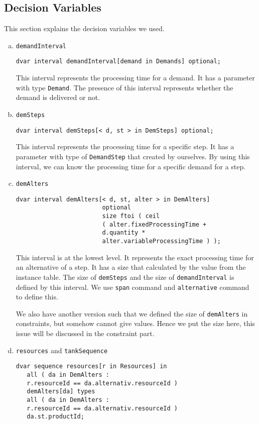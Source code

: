 \documentclass[a4paper, 12pt]{article}
\newcommand{\twoline}{\vspace{2ex}}
\begin{document}
\subsection{Decision Variables}
\twoline 

This section explains the decision variables we used. 
\begin{enumerate}[a.~]
\item \texttt{demandInterval}
\begin{lstlisting}
dvar interval demandInterval[demand in Demands] optional;
\end{lstlisting}
This interval represents the processing time for a demand. It has a parameter with type \texttt{Demand}. The presence of this interval represents whether the demand is delivered or not. 
\item \texttt{demSteps}
\begin{lstlisting}
dvar interval demSteps[< d, st > in DemSteps] optional;
\end{lstlisting}
This interval represents the processing time for a specific step. It has a parameter with type of \texttt{DemandStep} that created by ourselves. By using this interval, we can know the processing time for a specific demand for a step. 
\item \texttt{demAlters}
\begin{lstlisting}
dvar interval demAlters[< d, st, alter > in DemAlters] 
                        optional 
                        size ftoi ( ceil 
                        ( alter.fixedProcessingTime + 
                        d.quantity * 
                        alter.variableProcessingTime ) );
\end{lstlisting}
This interval is at the lowest level. It represents the exact processing time for an alternative of a step. It has a size that calculated by the value from the instance table. The size of \texttt{demSteps} and the size of \texttt{demandInterval} is defined by this interval. We use \texttt{span} command and \texttt{alternative} command to define this. 

We also have another version such that we defined the size of \texttt{demAlters} in constraints, but somehow cannot give values. Hence we put the size here, this issue will be discussed in the constraint part. 
\item \texttt{resources} and \texttt{tankSequence}
\begin{lstlisting}
dvar sequence resources[r in Resources] in 
   all ( da in DemAlters :
   r.resourceId == da.alternativ.resourceId ) 
   demAlters[da] types 
   all ( da in DemAlters : 
   r.resourceId == da.alternativ.resourceId ) 
   da.st.productId;
  

\end{lstlisting}
\end{enumerate}
\end{document}
